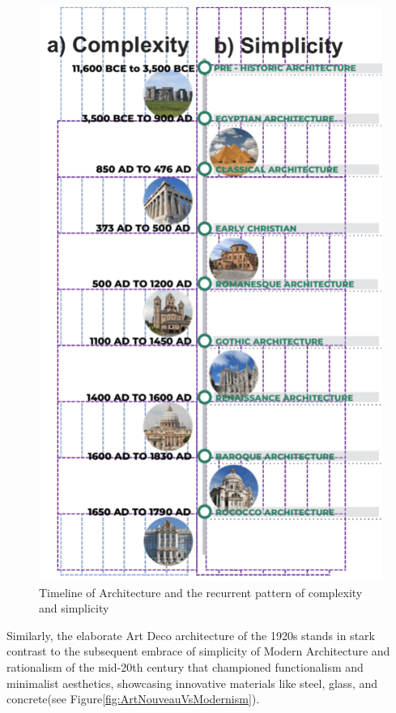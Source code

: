 
     \begin{figure}[htb]
          \centering
          \includegraphics[width= \linewidth]{Images/TimelineArchitecture}
          \caption{Timeline of Architecture and the recurrent pattern of complexity and simplicity}
          \label{fig:TimelineArchitecture}
        \end{figure}

Similarly, the elaborate Art Deco architecture of the 1920s stands in stark contrast to the subsequent embrace of simplicity of Modern Architecture and rationalism  of the mid-20th century that championed functionalism and minimalist aesthetics, showcasing innovative materials like steel, glass, and concrete\cite{Stacbond2020}(see Figure\ref{fig:ArtNouveauVsModernism}).

